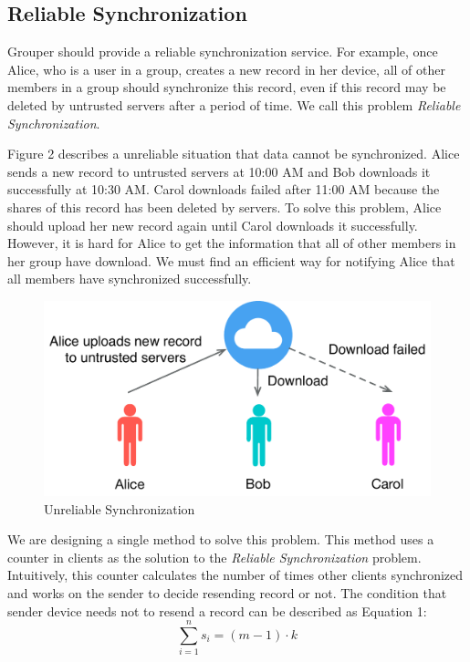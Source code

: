 \documentclass[twocolumn,10pt]{article}
\begin{document}
\subsection{Reliable Synchronization}
Grouper should provide a reliable synchronization service. For example, once Alice, who is a user in a group, creates a new record in her device, all of other members in a group should synchronize this record, even if this record may be deleted by untrusted servers after a period of time. We call this problem \emph{Reliable Synchronization}.

Figure 2 describes a unreliable situation that data cannot be synchronized. Alice sends a new record to untrusted servers at 10:00 AM and Bob downloads it successfully at 10:30 AM. Carol downloads failed after 11:00 AM because the shares of this record has been deleted by servers. To solve this problem, Alice should upload her new record again until Carol downloads it successfully. However, it is hard for Alice to get the information that all of other members in her group have download. We must find an efficient way for notifying Alice that all members have synchronized successfully.

\begin{figure}[t]
	\centering
	\includegraphics[scale=0.35]{unreliabe_sync}
	\caption{Unreliable Synchronization}
\end{figure}

We are designing a single method to solve this problem. This method uses a counter in clients as the solution to the \emph{Reliable Synchronization} problem. Intuitively, this counter calculates the number of times other clients synchronized and works on the sender to decide resending record or not. The condition that sender device needs not to resend a record can be described as Equation 1:
\begin{equation}
\sum_{i=1}^{n}s_{i}=(m-1)\cdot k
\end{equation}
\end{document}
